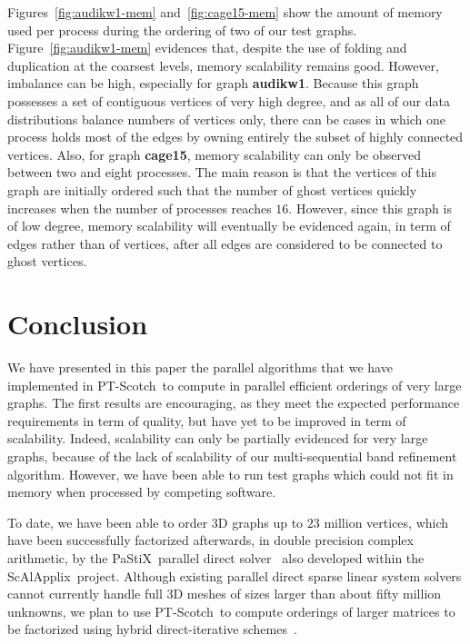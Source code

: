 \documentclass[fleqn,12pt,twoside]{article}
\newcommand{\pastix}{{\sc PaStiX}}               \newcommand{\libscotch}{{\sc libScotch}}         \newcommand{\scotch}{{\sc Scotch}}               \newcommand{\ptscotch}{{\sc PT-Scotch}}          \newcommand{\scalapplix}{{\sc ScAlApplix}}
\begin{document}
Figures~\ref{fig:audikw1-mem} and~\ref{fig:cage15-mem} show the amount
of memory used per process during the ordering of two of our test
graphs. Figure~\ref{fig:audikw1-mem} evidences that, despite the use
of folding and duplication at the coarsest levels, memory scalability
remains good. However, imbalance can be high, especially for graph
\textbf{audikw1}. Because this graph possesses a set of contiguous
vertices of very high degree, and as all of our data distributions
balance numbers of vertices only, there can be cases in which one
process holds most of the edges by owning entirely the subset of
highly connected vertices. Also, for graph \textbf{cage15}, memory
scalability can only be observed between two and eight processes. The
main reason is that the vertices of this graph are initially ordered
such that the number of ghost vertices quickly increases when the
number of processes reaches $16$. However, since this graph is of low
degree, memory scalability will eventually be evidenced again, in term
of edges rather than of vertices, after all edges are considered to be
connected to ghost vertices.



\section{Conclusion}
\label{secconcl}

We have presented in this paper the parallel algorithms that we have
implemented in \ptscotch\ to compute in parallel efficient orderings
of very large graphs. The first results are encouraging, as they meet
the expected performance requirements in term of quality, but have yet
to be improved in term of scalability. Indeed, scalability can only be
partially evidenced for very large graphs, because of the lack of
scalability of our multi-sequential band refinement algorithm.
However, we have been able to run test graphs which could not fit in
memory when processed by competing software.

To date, we have been able to order 3D graphs up to $23$ million
vertices, which have been successfully factorized afterwards, in double
precision complex arithmetic, by the \pastix\ parallel direct
solver~\cite{heraro05} also developed within the \scalapplix\ project.
Although existing parallel direct sparse linear system
solvers cannot currently handle full 3D meshes of sizes larger than
about fifty million unknowns, we plan to use \ptscotch\ to compute
orderings of larger matrices to be factorized using hybrid
direct-iterative schemes~\cite{hesa06,heraro07}.
\\
\end{document}
